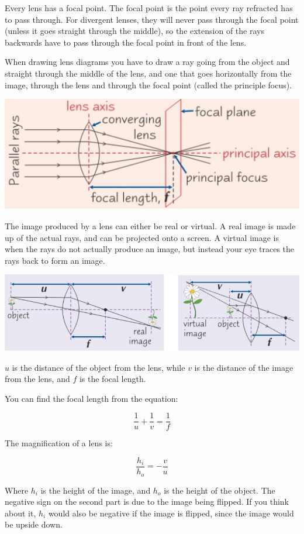 \documentclass[a4paper, 12pt]{article}
\begin{document}
Every lens has a focal point. The focal point is the point every ray refracted has to pass through. For divergent lenses, they will never pass through the focal point (unless it goes straight through the middle), so the extension of the rays backwards have to pass through the focal point in front of the lens.

When drawing lens diagrams you have to draw a ray going from the object and straight through the middle of the lens, and one that goes horizontally from the image, through the lens and through the focal point (called the principle focus).

\includegraphics[width=\textwidth]{images/lensDiagram.png}

The image produced by a lens can either be real or virtual. A real image is made up of the actual rays, and can be projected onto a screen. A virtual image is when the rays do not actually produce an image, but instead your eye traces the rays back to form an image.

\includegraphics[width=\textwidth]{images/realAndImaginaryImages.png}

$u$ is the distance of the object from the lens, while $v$ is the distance of the image from the lens, and $f$ is the focal length.

You can find the focal length from the equation:

$$
\frac{1}{u} + \frac{1}{v} = \frac{1}{f}
$$

The magnification of a lens is:

$$
\frac{h_i}{h_o} = -\frac{v}{u}
$$

Where $h_i$ is the height of the image, and $h_o$ is the height of the object. The negative sign on the second part is due to the image being flipped. If you think about it, $h_i$ would also be negative if the image is flipped, since the image would be upside down.
\end{document}
